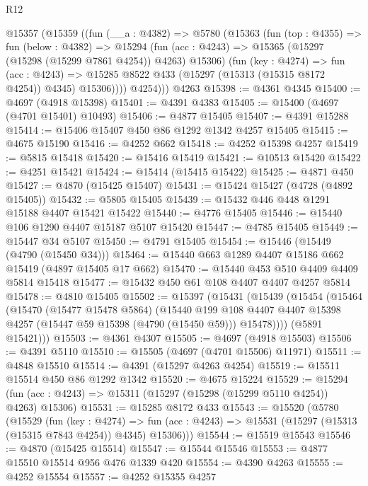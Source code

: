 \begin{lexlean}{R12}
\begin{coremodule}
    @15357
      (@15359
        ((fun (__a : @4382) =>
        @5780
          (@15363
            (fun (top : @4355) =>
            fun (below : @4382) =>
            @15294
              (fun (acc : @4243) => @15365 (@15297 (@15298 (@15299 @7861 @4254)) @4263) @15306)
              (fun (key : @4274) =>
              fun (acc : @4243) =>
              @15285 @8522 @433 (@15297 (@15313 (@15315 @8172 @4254)) @4345) @15306))))
          @4254)))
    @4263
@15398 := @4361 @4345
@15400 := @4697 (@4918 @15398)
@15401 := @4391 @4383
@15405 := @15400 (@4697 (@4701 @15401) @10493)
@15406 := @4877 @15405
@15407 := @4391 @15288
@15414 := @15406 @15407 @450 @86 @1292 @1342 @4257 @15405
@15415 := @4675 @15190
@15416 := @4252 @662
@15418 := @4252 @15398 @4257
@15419 := @5815 @15418
@15420 := @15416 @15419
@15421 := @10513 @15420
@15422 := @4251 @15421
@15424 := @15414 (@15415 @15422)
@15425 := @4871 @450
@15427 := @4870 (@15425 @15407)
@15431 := @15424 @15427 (@4728 (@4892 @15405))
@15432 := @5805 @15405
@15439 := @15432 @446 @448 @1291 @15188 @4407 @15421 @15422
@15440 := @4776 @15405
@15446 := @15440 @106 @1290 @4407 @15187 @5107 @15420
@15447 := @4785 @15405
@15449 := @15447 @34 @5107
@15450 := @4791 @15405
@15454 := @15446 (@15449 (@4790 (@15450 @34)))
@15464 := @15440 @663 @1289 @4407 @15186 @662 @15419 (@4897 @15405 @17 @662)
@15470 := @15440 @453 @510 @4409 @4409 @5814 @15418
@15477 := @15432 @450 @61 @108 @4407 @4407 @4257 @5814
@15478 := @4810 @15405
@15502 := @15397
    (@15431
      (@15439
        (@15454
          (@15464
            (@15470
              (@15477 @15478 @5864)
              (@15440
                @199
                @108
                @4407
                @4407
                @15398
                @4257
                (@15447 @59 @15398 (@4790 (@15450 @59)))
                @15478))))
        (@5891 @15421)))
@15503 := @4361 @4307
@15505 := @4697 (@4918 @15503)
@15506 := @4391 @5110
@15510 := @15505 (@4697 (@4701 @15506) @11971)
@15511 := @4848 @15510
@15514 := @4391 (@15297 @4263 @4254)
@15519 := @15511 @15514 @450 @86 @1292 @1342
@15520 := @4675 @15224
@15529 := @15294 (fun (acc : @4243) => @15311 (@15297 (@15298 (@15299 @5110 @4254)) @4263) @15306)
@15531 := @15285 @8172 @433
@15543 := @15520
    (@5780
      (@15529
        (fun (key : @4274) =>
        fun (acc : @4243) => @15531 (@15297 (@15313 (@15315 @7843 @4254)) @4345) @15306)))
@15544 := @15519 @15543
@15546 := @4870 (@15425 @15514)
@15547 := @15544 @15546
@15553 := @4877 @15510 @15514 @956 @476 @1339 @420
@15554 := @4390 @4263
@15555 := @4252 @15554
@15557 := @4252 @15355 @4257

\end{coremodule}
\end{lexlean}
